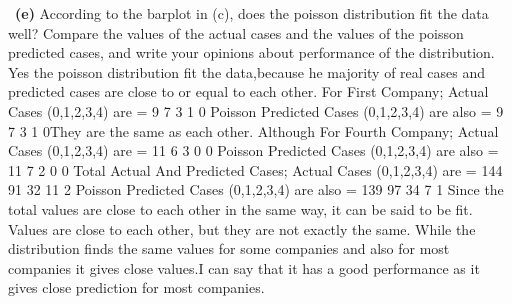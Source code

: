 \documentclass[a4 paper]{article}
\numberwithin{equation}{section}
\newcommand{\subproblem}[1]{~\newline\textbf{(#1)}}
\newcommand{\0}{\mathbf{0}}
\begin{document}
	\subproblem{e} According to the barplot in (c), does the poisson distribution fit the data well? Compare the values of the actual cases and the values of the poisson predicted cases, and write your opinions about performance of the distribution.\\
	Yes the poisson distribution fit the data,because he majority of real cases and predicted cases are close to or equal to each other.
	\newline For First Company;\newline
    Actual Cases (0,1,2,3,4) are = 9 7 3 1 0 \newline
    Poisson Predicted Cases (0,1,2,3,4) are also  = 9 7 3 1 0\newline They are the same as each other.
    Although For Fourth Company;\newline
    Actual Cases (0,1,2,3,4) are = 11 6 3 0 0 \newline
    Poisson Predicted Cases (0,1,2,3,4) are also  = 11 7 2 0 0\newline
    Total Actual And Predicted Cases;\newline
    Actual Cases (0,1,2,3,4) are = 144 91 32 11 2 \newline
    Poisson Predicted Cases (0,1,2,3,4) are also  = 139 97 34 7 1\newline
    Since the total values are close to each other in the same way, it can be said to be fit.\newline
    Values are close to each other, but they are not exactly the same.\newline
    While the distribution finds the same values for some companies and also for most companies it gives close values.I can say that it has a  good performance as it gives close prediction for most companies.
	
\end{document}
